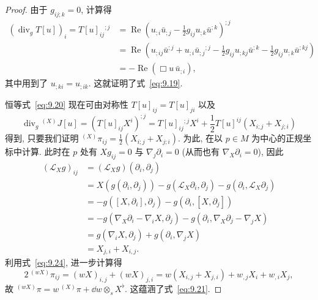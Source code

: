 \begin{proof}
由于 $g_{ij;k} = 0$, 计算得
\begin{equation}\label{eq:9.22}
    \begin{aligned}
        (\operatorname{div}_g T[u])_i = T[u]_{ij}{}^{;j} &= \operatorname{Re} \left( u_{;i} \bar u_{;j} - \frac12 g_{ij} u_{;k} \bar u^{;k} \right)^{;j} \\
        &= \operatorname{Re} \left( u_{;ij} \bar u^{;j} + u_{;i} \bar u_{;j}{}^{;j} - \frac12 g_{ij} u_{;kj} \bar u^{;k} - \frac12 g_{ij} u_{;k} \bar u^{;kj} \right) \\
        &= -\operatorname{Re}(\Box u \, \bar u_{;i}),
    \end{aligned}
\end{equation}
其中用到了 $u_{;ki} = u_{;ik}$. 这就证明了式~\eqref{eq:9.19}.

恒等式~\eqref{eq:9.20} 现在可由对称性 $T[u]_{ij} = T[u]_{ji}$ 以及
\begin{equation}\label{eq:9.23}
    \operatorname{div}_g {}^{(X)} J[u] = (T[u]_{ij} X^i)^{;j} = T[u]_{ij}{}^{;j} X^i + \frac12 T[u]^{ij} (X_{i;j} + X_{j;i})
\end{equation}
得到, 只要我们证明 ${}^{(X)} \pi_{ij} = \frac12 (X_{i;j} + X_{j;i})$. 为此, 在以 $p \in M$ 为中心的正规坐标中计算. 此时在 $p$ 处有 $X g_{ij} = 0$ 与 $\nabla_j \partial_i = 0$ (从而也有 $\nabla_X \partial_i = 0$), 因此
\begin{equation}\label{eq:9.24}
    \begin{aligned}
        (\mathcal{L}_X g)_{ij} &= (\mathcal{L}_X g)(\partial_i, \partial_j) \\
        &= X(g(\partial_i, \partial_j)) - g(\mathcal{L}_X \partial_i, \partial_j) - g(\partial_i, \mathcal{L}_X \partial_j) \\
        &= -g([X, \partial_i], \partial_j) - g(\partial_i, [X, \partial_j]) \\
        &= -g(\nabla_X \partial_i - \nabla_i X, \partial_j) - g(\partial_i, \nabla_X \partial_j - \nabla_j X) \\
        &= g(\nabla_i X, \partial_j) + g(\partial_i, \nabla_j X) \\
        &= X_{j,i} + X_{i,j}.
    \end{aligned}
\end{equation}
利用式~\eqref{eq:9.24}, 进一步计算得
\begin{equation}\label{eq:9.25}
    2 \, {}^{(wX)} \pi_{ij} = (wX)_{i,j} + (wX)_{j,i} = w(X_{i,j} + X_{j,i}) + w_{,j} X_i + w_{,i} X_j,
\end{equation}
故 ${}^{(wX)} \pi = w \, {}^{(X)} \pi + \dd w \otimes_s X^\flat$. 这蕴涵了式~\eqref{eq:9.21}.
\end{proof}

